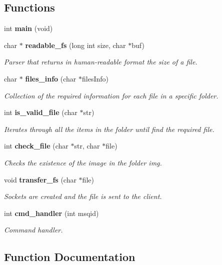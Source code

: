 \subsection*{Functions}
\begin{DoxyCompactItemize}
\item 
int \textbf{ main} (void)
\item 
char $\ast$ \textbf{ readable\+\_\+fs} (long int size, char $\ast$buf)
\begin{DoxyCompactList}\small\item\em Parser that returns in human-\/readable format the size of a file. \end{DoxyCompactList}\item 
char $\ast$ \textbf{ files\+\_\+info} (char $\ast$files\+Info)
\begin{DoxyCompactList}\small\item\em Collection of the required information for each file in a specific folder. \end{DoxyCompactList}\item 
int \textbf{ is\+\_\+valid\+\_\+file} (char $\ast$str)
\begin{DoxyCompactList}\small\item\em Iterates through all the items in the folder until find the required file. \end{DoxyCompactList}\item 
int \textbf{ check\+\_\+file} (char $\ast$str, char $\ast$file)
\begin{DoxyCompactList}\small\item\em Checks the existence of the image in the folder img. \end{DoxyCompactList}\item 
void \textbf{ transfer\+\_\+fs} (char $\ast$file)
\begin{DoxyCompactList}\small\item\em Sockets are created and the file is sent to the client. \end{DoxyCompactList}\item 
int \textbf{ cmd\+\_\+handler} (int msqid)
\begin{DoxyCompactList}\small\item\em Command handler. \end{DoxyCompactList}\end{DoxyCompactItemize}


\subsection{Function Documentation}
\mbox{\label{fileserv_8c_a934e48b50634987f1069e535f4f9753a}} 
